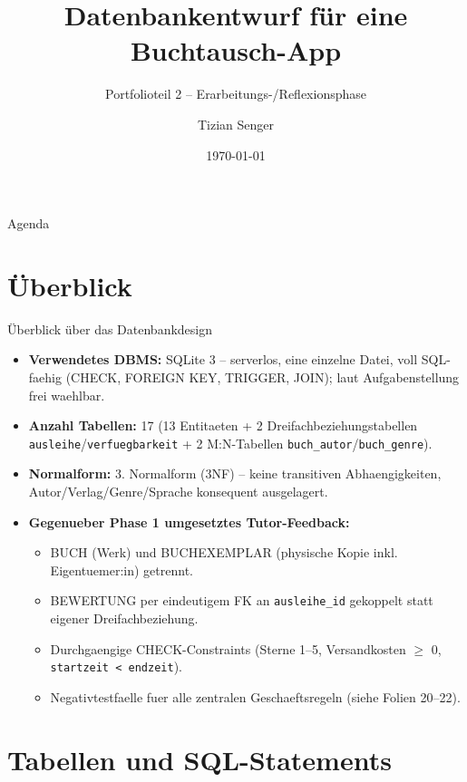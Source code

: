 \documentclass[11pt,aspectratio=169]{beamer}
\title[Buchtausch-App]{Datenbankentwurf für eine Buchtausch-App}
\subtitle{Portfolioteil 2 -- Erarbeitungs-/Reflexionsphase}
\author[T. Senger]{Tizian Senger}
\institute[IU14143428]{DLBDSPBDM01\_D -- Data-Mart-Erstellung in SQL \\ Matrikelnummer: IU14143428 \\ \url{https://github.com/TizianSenger/IUDatabaseProject}}
\date[26.09.2026]{\today}
\begin{document}
\begin{frame}
  \titlepage
\end{frame}

\begin{frame}{Agenda}
  \tableofcontents
\end{frame}

\section{Überblick}

\begin{frame}{Überblick über das Datenbankdesign}
  \small
  \begin{itemize}
    \item \textbf{Verwendetes DBMS:} SQLite 3 -- serverlos, eine einzelne Datei, voll SQL-faehig
      (CHECK, FOREIGN KEY, TRIGGER, JOIN); laut Aufgabenstellung frei waehlbar.
    \item \textbf{Anzahl Tabellen:} 17 (13 Entitaeten + 2 Dreifachbeziehungstabellen
      \texttt{ausleihe}/\texttt{verfuegbarkeit} + 2 M:N-Tabellen \texttt{buch\_autor}/\texttt{buch\_genre}).
    \item \textbf{Normalform:} 3. Normalform (3NF) -- keine transitiven Abhaengigkeiten,
      Autor/Verlag/Genre/Sprache konsequent ausgelagert.
    \item \textbf{Gegenueber Phase 1 umgesetztes Tutor-Feedback:}
      \begin{itemize}
        \footnotesize
        \item BUCH (Werk) und BUCHEXEMPLAR (physische Kopie inkl. Eigentuemer:in) getrennt.
        \item BEWERTUNG per eindeutigem FK an \texttt{ausleihe\_id} gekoppelt statt eigener Dreifachbeziehung.
        \item Durchgaengige CHECK-Constraints (Sterne 1--5, Versandkosten $\geq$ 0, \texttt{startzeit < endzeit}).
        \item Negativtestfaelle fuer alle zentralen Geschaeftsregeln (siehe Folien 20--22).
      \end{itemize}
  \end{itemize}
\end{frame}

\section{Tabellen und SQL-Statements}
\end{document}

